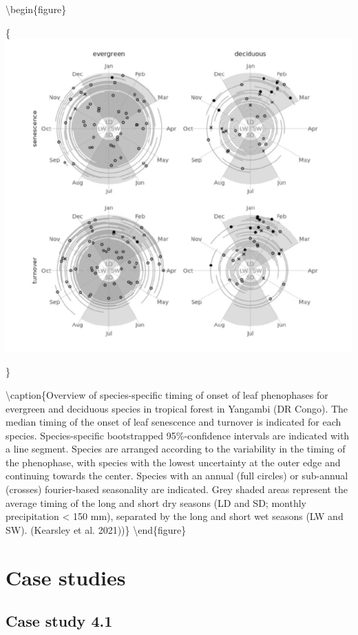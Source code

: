 \documentclass[12pt,oneside]{book}
\begin{document}
\textbackslash{}begin\{figure\}

\{\centering \includegraphics[width=0.8\linewidth]{figures/chap4/f410_kearsley}

\}

\textbackslash{}caption\{Overview of species-specific timing of onset of
leaf phenophases for evergreen and deciduous species in tropical forest
in Yangambi (DR Congo). The median timing of the onset of leaf
senescence and turnover is indicated for each species. Species-specific
bootstrapped 95\%-confidence intervals are indicated with a line
segment. Species are arranged according to the variability in the timing
of the phenophase, with species with the lowest uncertainty at the outer
edge and continuing towards the center. Species with an annual (full
circles) or sub-annual (crosses) fourier-based seasonality are
indicated. Grey shaded areas represent the average timing of the long
and short dry seasons (LD and SD; monthly precipitation \textless{} 150
mm), separated by the long and short wet seasons (LW and SW). (Kearsley
et al. 2021))\}\label{fig:f410} \textbackslash{}end\{figure\}

\section{Case studies}\label{case-studies-2}

\subsection{Case study 4.1}\label{case-study-4.1}
\end{document}
